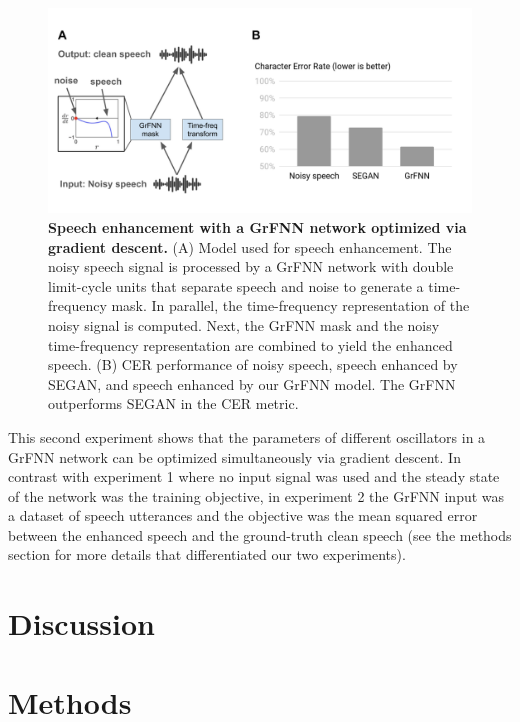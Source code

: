 \documentclass{report}
\begin{document}
\begin{figure}
    \centering
    \includegraphics[width=1.0\textwidth]{figures/fig5_2.png}
    \caption[Speech enhancement with a GrFNN network optimized via gradient descent]{\textbf{Speech enhancement with a GrFNN network optimized via gradient descent.} (A) Model used for speech enhancement. The noisy speech signal is processed by a GrFNN network with double limit-cycle units that separate speech and noise to generate a time-frequency mask. In parallel, the time-frequency representation of the noisy signal is computed. Next, the GrFNN mask and the noisy time-frequency representation are combined to yield the enhanced speech. (B) CER performance of noisy speech, speech enhanced by SEGAN, and speech enhanced by our GrFNN model. The GrFNN outperforms SEGAN in the CER metric.}
    \label{f5_2}
\end{figure}

This second experiment shows that the parameters of different oscillators in a GrFNN network can be optimized simultaneously via gradient descent. In contrast with experiment 1 where no input signal was used and the steady state of the network was the training objective, in experiment 2 the GrFNN input was a dataset of speech utterances and the objective was the mean squared error between the enhanced speech and the ground-truth clean speech (see the methods section for more details that differentiated our two experiments). 

\section{Discussion}

\section{Methods}
\end{document}

